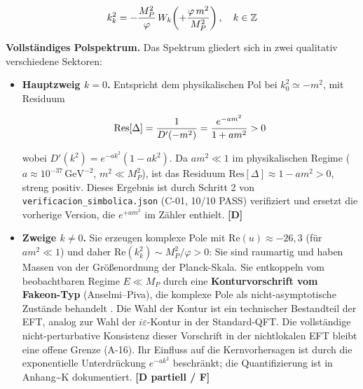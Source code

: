 ﻿\documentclass[11pt,letterpaper]{article}
\begin{document}
\begin{equation*}
  \resizebox{\ifdim\width>\linewidth \linewidth\else\width\fi}{!}{$\displaystyle k_k^2 = -\frac{M_P^2}{\varphi}\,W_k\!\left(+\frac{\varphi\,m^2}{M_P^2}\right), \quad k \in \mathbb{Z}$}
\end{equation*}

\textbf{Vollständiges Polspektrum.} Das Spektrum gliedert sich in zwei qualitativ verschiedene Sektoren:

\begin{itemize}[leftmargin=*]
\item \textbf{Hauptzweig $k=0$.} Entspricht dem physikalischen Pol bei $k_0^2 \simeq -m^2$, mit Residuum

\begin{equation*}
  \resizebox{\ifdim\width>\linewidth \linewidth\else\width\fi}{!}{$\displaystyle \mathrm{Res}[\Delta] = \frac{1}{D'(-m^2)} = \frac{e^{-am^2}}{1 + am^2} > 0$}
\end{equation*}

wobei $D'(k^2) = e^{-ak^2}(1 - ak^2)$. Da $am^2 \ll 1$ im physikalischen Regime ($a \approx 10^{-37}\,\mathrm{GeV}^{-2}$, $m^2 \ll M_P^2$), ist das Residuum $\mathrm{Res}[\Delta] \approx 1 - am^2 > 0$, streng positiv. Dieses Ergebnis ist durch Schritt 2 von \texttt{verificacion\_simbolica.json} (C-01, 10/10 PASS) verifiziert und ersetzt die vorherige Version, die $e^{+am^2}$ im Zähler enthielt. \textbf{[D]}

\item \textbf{Zweige $k \neq 0$.} Sie erzeugen komplexe Pole mit $\mathrm{Re}(u) \approx -26{,}3$ (für $am^2 \ll 1$) und daher $\mathrm{Re}(k_k^2) \sim M_P^2/\varphi > 0$: Sie sind raumartig und haben Massen von der Größenordnung der Planck-Skala. Sie entkoppeln vom beobachtbaren Regime $E \ll M_P$ durch eine \textbf{Konturvorschrift vom Fakeon-Typ} (Anselmi--Piva), die komplexe Pole als nicht-asymptotische Zustände behandelt \cite{AnselmiPiva2017a}. Die Wahl der Kontur ist ein technischer Bestandteil der EFT, analog zur Wahl der $i\varepsilon$-Kontur in der Standard-QFT. Die vollständige nicht-perturbative Konsistenz dieser Vorschrift in der nichtlokalen EFT bleibt eine offene Grenze (A-16). Ihr Einfluss auf die Kernvorhersagen ist durch die exponentielle Unterdrückung $e^{-ak^2}$ beschränkt; die Quantifizierung ist in Anhang\textasciitilde{}K dokumentiert. \textbf{[D partiell / F]}
\end{itemize}
\end{document}
